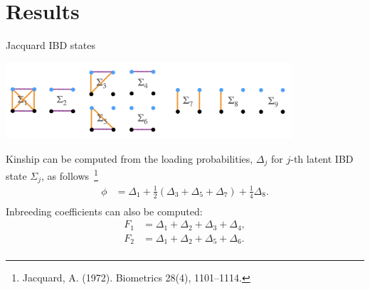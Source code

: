 \documentclass[]{beamer}
\begin{document}
\section{Results}
\begin{frame}{Jacquard IBD states} 
\begin{center} 
\includegraphics[width=0.8\textwidth]{jacquard.png}  
\end{center}
Kinship can be computed from the loading probabilities, $\Delta_j$ for $j$-th latent IBD state $\Sigma_j$, as follows~\footnote{Jacquard, A. (1972). Biometrics 28(4), 1101–1114.} 
\begin{equation}\label{e1}
\begin{aligned}
\phi &= \Delta_1 + \frac{1}{2}(\Delta_3+\Delta_5+\Delta_7) + \frac{1}{4} \Delta_8.  \\
\end{aligned}
\end{equation}
Inbreeding coefficients can also be computed: 
\begin{equation}\label{e2}
\begin{aligned}
F_1 &= \Delta_1 + \Delta_2 + \Delta_3 + \Delta_4, \\                                                                                                     
F_2 &= \Delta_1 + \Delta_2 + \Delta_5 + \Delta_6. \\
\end{aligned}
\end{equation}


\end{frame}
\end{document}
